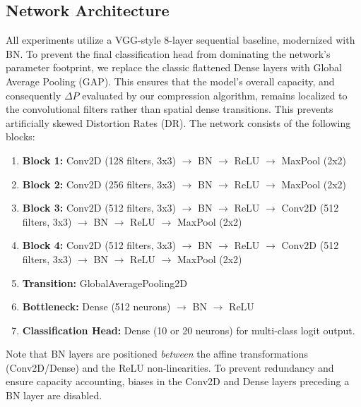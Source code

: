 \documentclass[11pt, a4paper, copyright, gdm]{google}
\theoremstyle{definition}
\begin{document}
\subsection{Network Architecture}
All experiments utilize a VGG-style 8-layer sequential baseline, modernized with BN. To prevent the final classification head from dominating the network's parameter footprint, we replace the classic flattened Dense layers with Global Average Pooling (GAP). This ensures that the model's overall capacity, and consequently $\Delta P$ evaluated by our compression algorithm, remains localized to the convolutional filters rather than spatial dense transitions. This prevents artificially skewed Distortion Rates (DR). The network consists of the following blocks:
\begin{enumerate}
    \item \textbf{Block 1:} Conv2D (128 filters, 3x3) $\to$ BN $\to$ ReLU $\to$ MaxPool (2x2)
    \item \textbf{Block 2:} Conv2D (256 filters, 3x3) $\to$ BN $\to$ ReLU $\to$ MaxPool (2x2)
    \item \textbf{Block 3:} Conv2D (512 filters, 3x3) $\to$ BN $\to$ ReLU $\to$ Conv2D (512 filters, 3x3) $\to$ BN $\to$ ReLU $\to$ MaxPool (2x2)
    \item \textbf{Block 4:} Conv2D (512 filters, 3x3) $\to$ BN $\to$ ReLU $\to$ Conv2D (512 filters, 3x3) $\to$ BN $\to$ ReLU $\to$ MaxPool (2x2)
    \item \textbf{Transition:} GlobalAveragePooling2D
    \item \textbf{Bottleneck:} Dense (512 neurons) $\to$ BN $\to$ ReLU
    \item \textbf{Classification Head:} Dense (10 or 20 neurons) for multi-class logit output.
\end{enumerate}
Note that BN layers are positioned \textit{between} the affine transformations (Conv2D/Dense) and the ReLU non-linearities. To prevent redundancy and ensure capacity accounting, biases in the Conv2D and Dense layers preceding a BN layer are disabled. 
\end{document}
